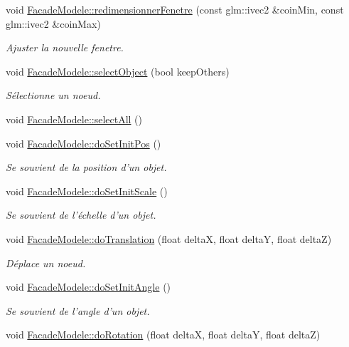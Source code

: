 \begin{DoxyCompactItemize}
\item 
void \hyperlink{group__inf2990_ga0a03742a7fa2215a6dd6de99cbfd7b05}{Facade\-Modele\-::redimensionner\-Fenetre} (const glm\-::ivec2 \&coin\-Min, const glm\-::ivec2 \&coin\-Max)
\begin{DoxyCompactList}\small\item\em Ajuster la nouvelle fenetre. \end{DoxyCompactList}\item 
void \hyperlink{group__inf2990_gaa1eea4eb52c6ec22980e0b21e2bdbcd4}{Facade\-Modele\-::select\-Object} (bool keep\-Others)
\begin{DoxyCompactList}\small\item\em Sélectionne un noeud. \end{DoxyCompactList}\item 
void \hyperlink{group__inf2990_ga91c3543726ad826767a5f1fdd42138f8}{Facade\-Modele\-::select\-All} ()
\item 
void \hyperlink{group__inf2990_gacbc609209644f410f7a576a8d1e509d0}{Facade\-Modele\-::do\-Set\-Init\-Pos} ()
\begin{DoxyCompactList}\small\item\em Se souvient de la position d'un objet. \end{DoxyCompactList}\item 
void \hyperlink{group__inf2990_gaccc885ec8fc20fa6709a2f74a609ce32}{Facade\-Modele\-::do\-Set\-Init\-Scale} ()
\begin{DoxyCompactList}\small\item\em Se souvient de l'échelle d'un objet. \end{DoxyCompactList}\item 
void \hyperlink{group__inf2990_ga3c29bb5fb742aacf7bea3f62357c4f48}{Facade\-Modele\-::do\-Translation} (float delta\-X, float delta\-Y, float delta\-Z)
\begin{DoxyCompactList}\small\item\em Déplace un noeud. \end{DoxyCompactList}\item 
void \hyperlink{group__inf2990_gadf7aee8a39d60a055bef3cd05cdda2db}{Facade\-Modele\-::do\-Set\-Init\-Angle} ()
\begin{DoxyCompactList}\small\item\em Se souvient de l'angle d'un objet. \end{DoxyCompactList}\item 
void \hyperlink{group__inf2990_ga51bb0f8d8e9a6c421ca688e83e10d670}{Facade\-Modele\-::do\-Rotation} (float delta\-X, float delta\-Y, float delta\-Z)

\end{DoxyCompactItemize}

